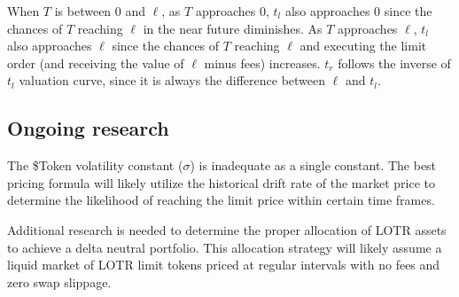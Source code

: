 \documentclass[12pt]{article}
\begin{document}
         \begin{center}
         \end{center}
         When $T$ is between $0$ and $\ell$, as $T$ approaches $0$, $t_{l}$ also approaches $0$ since the chances of $T$ reaching $\ell$ in the near future diminishes. As $T$ approaches $\ell$, $t_{l}$ also approaches $\ell$ since the chances of $T$ reaching $\ell$ and executing the limit order (and receiving the value of $\ell$ minus fees) increases. $t_{r}$ follows the inverse of $t_{l}$ valuation curve, since it is always the difference between $\ell$ and $t_{l}$.
      
      \subsection{Ongoing research}
         The \$Token volatility constant ($\sigma$) is inadequate as a single constant. The best pricing formula will likely utilize the historical drift rate of the market price to determine the likelihood of reaching the limit price within certain time frames.
         
         Additional research is needed to determine the proper allocation of LOTR assets to achieve a delta neutral portfolio. This allocation strategy will likely assume a liquid market of LOTR limit tokens priced at regular intervals with no fees and zero swap slippage.
\end{document}
